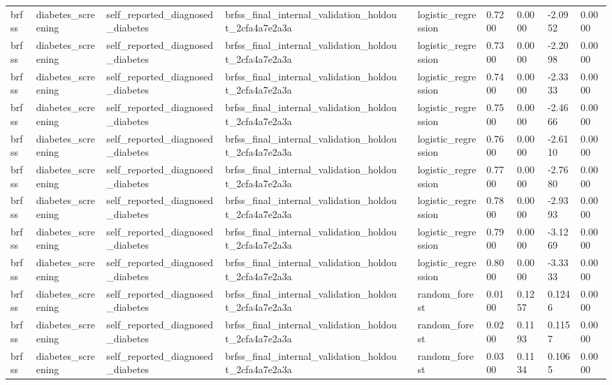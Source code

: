 \begin{tabular}{llllllllll}
brfss & diabetes\_screening & self\_reported\_diagnosed\_diabetes & brfss\_final\_internal\_validation\_holdout\_2cfa4a7e2a3a &  & logistic\_regression & 0.7200 & 0.0000 & -2.0952 & 0.0000 \\
brfss & diabetes\_screening & self\_reported\_diagnosed\_diabetes & brfss\_final\_internal\_validation\_holdout\_2cfa4a7e2a3a &  & logistic\_regression & 0.7300 & 0.0000 & -2.2098 & 0.0000 \\
brfss & diabetes\_screening & self\_reported\_diagnosed\_diabetes & brfss\_final\_internal\_validation\_holdout\_2cfa4a7e2a3a &  & logistic\_regression & 0.7400 & 0.0000 & -2.3333 & 0.0000 \\
brfss & diabetes\_screening & self\_reported\_diagnosed\_diabetes & brfss\_final\_internal\_validation\_holdout\_2cfa4a7e2a3a &  & logistic\_regression & 0.7500 & 0.0000 & -2.4666 & 0.0000 \\
brfss & diabetes\_screening & self\_reported\_diagnosed\_diabetes & brfss\_final\_internal\_validation\_holdout\_2cfa4a7e2a3a &  & logistic\_regression & 0.7600 & 0.0000 & -2.6110 & 0.0000 \\
brfss & diabetes\_screening & self\_reported\_diagnosed\_diabetes & brfss\_final\_internal\_validation\_holdout\_2cfa4a7e2a3a &  & logistic\_regression & 0.7700 & 0.0000 & -2.7680 & 0.0000 \\
brfss & diabetes\_screening & self\_reported\_diagnosed\_diabetes & brfss\_final\_internal\_validation\_holdout\_2cfa4a7e2a3a &  & logistic\_regression & 0.7800 & 0.0000 & -2.9393 & 0.0000 \\
brfss & diabetes\_screening & self\_reported\_diagnosed\_diabetes & brfss\_final\_internal\_validation\_holdout\_2cfa4a7e2a3a &  & logistic\_regression & 0.7900 & 0.0000 & -3.1269 & 0.0000 \\
brfss & diabetes\_screening & self\_reported\_diagnosed\_diabetes & brfss\_final\_internal\_validation\_holdout\_2cfa4a7e2a3a &  & logistic\_regression & 0.8000 & 0.0000 & -3.3333 & 0.0000 \\
brfss & diabetes\_screening & self\_reported\_diagnosed\_diabetes & brfss\_final\_internal\_validation\_holdout\_2cfa4a7e2a3a &  & random\_forest & 0.0100 & 0.1257 & 0.1246 & 0.0000 \\
brfss & diabetes\_screening & self\_reported\_diagnosed\_diabetes & brfss\_final\_internal\_validation\_holdout\_2cfa4a7e2a3a &  & random\_forest & 0.0200 & 0.1193 & 0.1157 & 0.0000 \\
brfss & diabetes\_screening & self\_reported\_diagnosed\_diabetes & brfss\_final\_internal\_validation\_holdout\_2cfa4a7e2a3a &  & random\_forest & 0.0300 & 0.1134 & 0.1065 & 0.0000 \\

\end{tabular}
